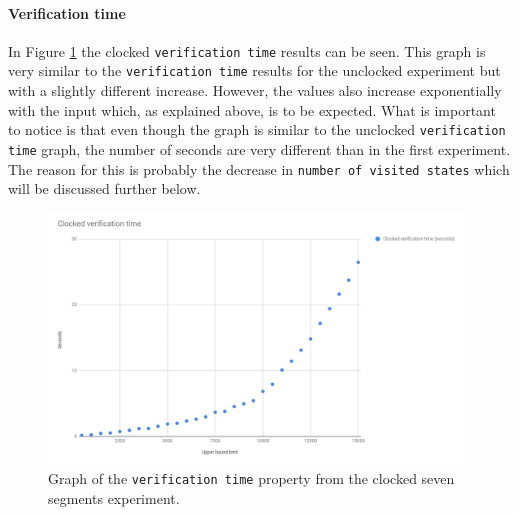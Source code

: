 \paragraph{Verification time}
In Figure \ref{fig:clocked_verification} the clocked \texttt{verification time}
results can be seen.
This graph is very similar to the \texttt{verification time} results for the unclocked experiment but with a slightly different increase. However, the values also increase exponentially with the input which, as explained above, is to be expected. What is important to notice is that even though the graph is similar to the unclocked \texttt{verification time} graph, the number of seconds are very different than in the first experiment. The reason for this is probably the decrease in \texttt{number of visited states} which will be discussed further below.
\begin{figure}
    \includegraphics[width=0.98\textwidth]{./figures/temporary_graphs/clocked_verification_time.jpg}
\caption{Graph of the \texttt{verification time} property from the clocked seven segments experiment.}
\label{fig:clocked_verification}
\end{figure}
